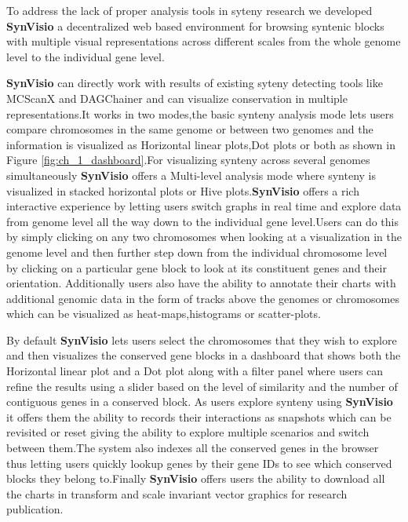 To address the lack of proper analysis tools in syteny research we developed \textbf{SynVisio} a decentralized web based environment for browsing syntenic blocks with multiple visual representations across different scales from the whole genome level to the individual gene level.

\textbf{SynVisio} can directly work with results of existing syteny detecting tools like MCScanX and DAGChainer and can visualize conservation in multiple representations.It works in two modes,the basic synteny analysis mode lets users compare chromosomes in the same genome or between two genomes and the information is visualized as Horizontal linear plots,Dot plots or both as shown in Figure \ref{fig:ch_1_dashboard}.For visualizing synteny across several genomes simultaneously \textbf{SynVisio} offers a Multi-level analysis mode where synteny is visualized in stacked horizontal plots or Hive plots.\textbf{SynVisio} offers a rich interactive experience by letting users switch graphs in real time and explore data from genome level all the way down to the individual gene level.Users can do this by simply clicking on any two chromosomes when looking at a visualization in the genome level and then further step down from the individual chromosome level by clicking on a particular gene block to look at its constituent  genes and their orientation. Additionally users also have the ability to annotate their charts with additional genomic data in the form of tracks above the genomes or chromosomes which can be visualized as heat-maps,histograms or scatter-plots.



By default \textbf{SynVisio} lets users select the chromosomes that they wish to explore and then visualizes the conserved gene blocks in a dashboard that shows both the Horizontal linear plot and a Dot plot along with a filter panel where users can refine the results using a slider based on the level of similarity and the number of contiguous genes in a conserved block.
As users explore synteny using \textbf{SynVisio} it offers them the ability to records their interactions as snapshots which can be revisited or reset giving the ability to explore multiple scenarios and switch between them.The system also indexes all the conserved genes in the browser thus letting users quickly lookup genes by their gene IDs to see which conserved blocks they belong to.Finally \textbf{SynVisio} offers users the ability to download all the charts in transform and scale invariant vector graphics for research publication.

